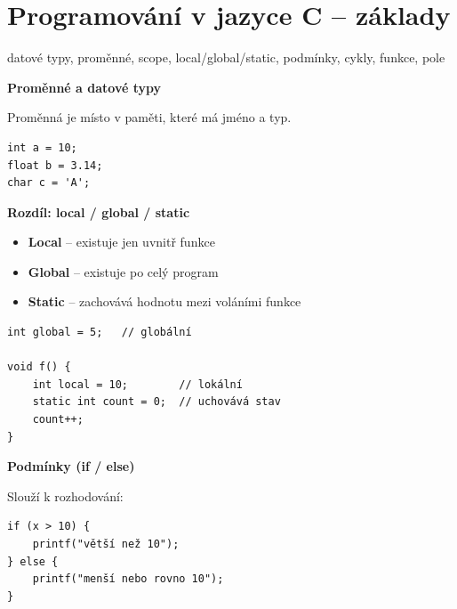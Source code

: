 \documentclass[a4paper,10pt]{article}
\begin{document}
\newpage


\section{Programování v jazyce C – základy}

\begin{pojmybox}
datové typy, proměnné, scope, local/global/static,
podmínky, cykly, funkce, pole
\end{pojmybox}

\begin{vysvetlenibox}

\textbf{Proměnné a datové typy}

Proměnná je místo v paměti, které má jméno a typ.

\begin{vzorcebox}
\begin{verbatim}
int a = 10;
float b = 3.14;
char c = 'A';
\end{verbatim}
\end{vzorcebox}

\textbf{Rozdíl: local / global / static}

\begin{itemize}
\item \textbf{Local} – existuje jen uvnitř funkce
\item \textbf{Global} – existuje po celý program
\item \textbf{Static} – zachovává hodnotu mezi voláními funkce
\end{itemize}

\begin{vzorcebox}
\begin{verbatim}
int global = 5;   // globální

void f() {
    int local = 10;        // lokální
    static int count = 0;  // uchovává stav
    count++;
}
\end{verbatim}
\end{vzorcebox}

\textbf{Podmínky (if / else)}

Slouží k rozhodování:

\begin{vzorcebox}
\begin{verbatim}
if (x > 10) {
    printf("větší než 10");
} else {
    printf("menší nebo rovno 10");
}
\end{verbatim}
\end{vzorcebox}


\end{vysvetlenibox}
\end{document}
